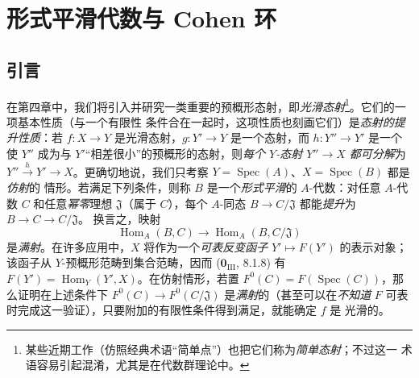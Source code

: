 \section{形式平滑代数与 Cohen 环}
\label{section:0.19-fr}
\label{0.19-fr}

\setcounter{subsection}{-1}
\subsection{引言}
\label{subsection:0.19.0-fr}
\label{0.19.0-fr}


\begin{env}[19.0.1]
\label{0.19.0.1-fr}
在第四章中，我们将引入并研究一类重要的预概形态射，即\emph{光滑态射}\footnote{
某些近期工作（仿照经典术语“简单点”）也把它们称为\emph{简单态射}；不过这一
术语容易引起混淆，尤其是在代数群理论中。}。它们的一项基本性质（与一个有限性
条件合在一起时，这项性质也刻画它们）是\emph{态射的提升性质}：若
$f:X\to Y$ 是光滑态射，$g:Y'\to Y$ 是一个态射，而 $h:Y''\to Y'$ 是一个
使 $Y''$ 成为与 $Y'$“相差很小”的预概形的态射，则\emph{每个 $Y$-态射
$Y''\to X$ 都可分解}为 $Y''\xrightarrow{h}Y'\to X$。更确切地说，我们只考察
$Y=\operatorname{Spec}(A)$、$X=\operatorname{Spec}(B)$ 都是\emph{仿射}的
情形。若满足下列条件，则称 $B$ 是一个\emph{形式平滑}的 $A$-代数：对任意
$A$-代数 $C$ 和任意\emph{幂零}理想 $\mathfrak J$（属于 $C$），每个 $A$-同态
$B\to C/\mathfrak J$ 都能\emph{提升}为 $B\to C\to C/\mathfrak J$。
换言之，映射
\[
  \operatorname{Hom}_A(B,C)\longrightarrow
  \operatorname{Hom}_A(B,C/\mathfrak J)
\]
是\emph{满射}。在许多应用中，$X$ 将作为一个\emph{可表反变函子}
$Y'\mapsto F(Y')$ 的表示对象；该函子从 $Y$-预概形范畴到集合范畴，因而
($\mathbf{0}_{\mathrm{III}}$, 8.1.8) 有
$F(Y')=\operatorname{Hom}_Y(Y',X)$。在仿射情形，若置
$F^0(C)=F(\operatorname{Spec}(C))$，那么证明在上述条件下
$F^0(C)\to F^0(C/\mathfrak J)$ 是\emph{满射}的（甚至可以在\emph{不知道}
$F$ 可表时完成这一验证），只要附加的有限性条件得到满足，就能确定 $f$ 是
光滑的。
\end{env}

